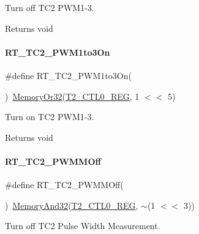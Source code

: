 Turn off T\+C2 P\+W\+M1-\/3. 

\begin{DoxyReturn}{Returns}
void 
\end{DoxyReturn}
\mbox{\label{a00047_adc090dee2463a2a27b57234e63f0c0b5}} 
\paragraph{\texorpdfstring{R\+T\+\_\+\+T\+C2\+\_\+\+P\+W\+M1to3\+On}{RT\_TC2\_PWM1to3On}}
{\footnotesize\ttfamily \#define R\+T\+\_\+\+T\+C2\+\_\+\+P\+W\+M1to3\+On(\begin{DoxyParamCaption}{ }\end{DoxyParamCaption})~\mbox{\hyperlink{a00020_a27874a97deab7cecdde5ddecf466e31e}{Memory\+Or32}}(\mbox{\hyperlink{a00020_adadaa0ab1ebbd7ba9b70dfd24c3ed44daf2e9deb36631241181cbf09e8d959475}{T2\+\_\+\+C\+T\+L0\+\_\+\+R\+EG}}, 1 $<$$<$ 5)}



Turn on T\+C2 P\+W\+M1-\/3. 

\begin{DoxyReturn}{Returns}
void 
\end{DoxyReturn}
\mbox{\label{a00047_abe6d0acfd60eb7058f0622de867c5b87}} 
\paragraph{\texorpdfstring{R\+T\+\_\+\+T\+C2\+\_\+\+P\+W\+M\+M\+Off}{RT\_TC2\_PWMMOff}}
{\footnotesize\ttfamily \#define R\+T\+\_\+\+T\+C2\+\_\+\+P\+W\+M\+M\+Off(\begin{DoxyParamCaption}{ }\end{DoxyParamCaption})~\mbox{\hyperlink{a00020_ad87cedffcaadc51db22594fce55173d4}{Memory\+And32}}(\mbox{\hyperlink{a00020_adadaa0ab1ebbd7ba9b70dfd24c3ed44daf2e9deb36631241181cbf09e8d959475}{T2\+\_\+\+C\+T\+L0\+\_\+\+R\+EG}}, $\sim$(1 $<$$<$ 3))}



Turn off T\+C2 Pulse Width Measurement. 


